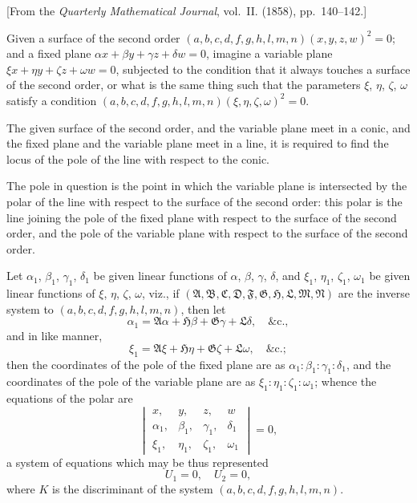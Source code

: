 \documentclass[12pt,a4paper]{article}
\theoremstyle{plain}
\theoremstyle{definition}
\begin{document}
[From the \textit{Quarterly Mathematical Journal}, vol.~II. (1858), pp.~140--142.]

Given a surface of the second order $(a, b, c, d, f, g, h, l, m, n)(x, y, z, w)^2 = 0$; and a fixed plane $\alpha x + \beta y + \gamma z + \delta w = 0$, imagine a variable plane $\xi x + \eta y + \zeta z + \omega w = 0$, subjected to the condition that it always touches a surface of the second order, or what is the same thing such that the parameters $\xi$, $\eta$, $\zeta$, $\omega$ satisfy a condition $(a, b, c, d, f, g, h, l, m, n)(\xi, \eta, \zeta, \omega)^2 = 0$.

The given surface of the second order, and the variable plane meet in a conic, and the fixed plane and the variable plane meet in a line, it is required to find the locus of the pole of the line with respect to the conic.

The pole in question is the point in which the variable plane is intersected by the polar of the line with respect to the surface of the second order: this polar is the line joining the pole of the fixed plane with respect to the surface of the second order, and the pole of the variable plane with respect to the surface of the second order.

Let $\alpha_1$, $\beta_1$, $\gamma_1$, $\delta_1$ be given linear functions of $\alpha$, $\beta$, $\gamma$, $\delta$, and $\xi_1$, $\eta_1$, $\zeta_1$, $\omega_1$ be given linear functions of $\xi$, $\eta$, $\zeta$, $\omega$, viz., if $(\mathfrak{A}, \mathfrak{B}, \mathfrak{C}, \mathfrak{D}, \mathfrak{F}, \mathfrak{G}, \mathfrak{H}, \mathfrak{L}, \mathfrak{M}, \mathfrak{N})$ are the inverse system to $(a, b, c, d, f, g, h, l, m, n)$, then let
\[
\alpha_1 = \mathfrak{A}\alpha + \mathfrak{H}\beta + \mathfrak{G}\gamma + \mathfrak{L}\delta, \quad \&\text{c.},
\]
and in like manner,
\[
\xi_1 = \mathfrak{A}\xi + \mathfrak{H}\eta + \mathfrak{G}\zeta + \mathfrak{L}\omega, \quad \&\text{c.};
\]
then the coordinates of the pole of the fixed plane are as $\alpha_1 : \beta_1 : \gamma_1 : \delta_1$, and the coordinates of the pole of the variable plane are as $\xi_1 : \eta_1 : \zeta_1 : \omega_1$; whence the equations of the polar are
\[
\begin{vmatrix}
x, & y, & z, & w \\
\alpha_1, & \beta_1, & \gamma_1, & \delta_1 \\
\xi_1, & \eta_1, & \zeta_1, & \omega_1
\end{vmatrix} = 0,
\]
a system of equations which may be thus represented
\[
U_1 = 0, \quad U_2 = 0,
\]
where $K$ is the discriminant of the system $(a, b, c, d, f, g, h, l, m, n)$.
\end{document}
